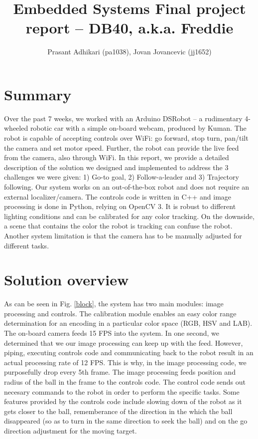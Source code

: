 \documentclass[12pt, twoside, a4paper, titlepage]{article}
\begin{document}
\title{Embedded Systems \linebreak Final project report -- DB40, a.k.a. Freddie }
\author{Prasant Adhikari (pa1038), Jovan Jovancevic (jj1652)}
\maketitle

\section{Summary}
Over the past 7 weeks, we worked with an Arduino DSRobot -- a rudimentary 4-wheeled robotic car with a simple on-board webcam, produced by Kuman. The robot is capable of accepting controls over WiFi: go forward, stop turn, pan/tilt the camera and set motor speed. Further, the robot can provide the live feed from the camera, also through WiFi. In this report, we provide a detailed description of the solution we designed and implemented to address the 3 challenges we were given: 1) Go-to goal, 2) Follow-a-leader and 3) Trajectory following. Our system works on an out-of-the-box robot and does not require an external localizer/camera. The controls code is written in C++ and image processing is done in Python, relying on OpenCV 3. It is robust to different lighting conditions and can be calibrated for any color tracking. On the downside, a scene that contains the color the robot is tracking can confuse the robot. Another system limitation is that the camera has to be manually adjusted for different tasks.

\section{Solution overview}
As can be seen in Fig. \ref{block}, the system has two main modules: image processing and controls. The calibration module enables an easy color range determination for an encoding in a particular color space (RGB, HSV and LAB). The on-board camera feeds 15 FPS into the system. In one second, we determined that we our image processing can keep up with the feed. However, piping, executing controls code and communicating back to the robot result in an actual processing rate of 12 FPS. This is why, in the image processing code, we purposefully drop every 5th frame. The image processing feeds position and radius of the ball in the frame to the controls code. The control code sends out necesary commands to the robot in order to perform the specific tasks. Some features provided by the controls code include slowing down of the robot as it gets closer to the ball, rememberance of the direction in the which the ball disappeared (so as to turn in the same direction to seek the ball) and on the go direction adjustment for the moving target. 
\end{document}
